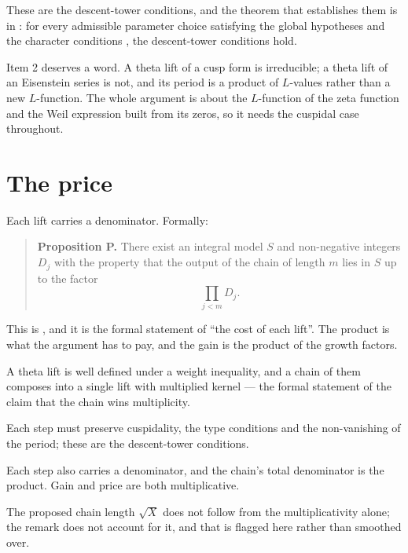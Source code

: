 These are the descent-tower conditions, and the theorem that establishes them
is  in
: for every admissible parameter
choice satisfying the global hypotheses  and the character
conditions , the descent-tower conditions hold.

Item 2 deserves a word. A theta lift of a cusp form is irreducible; a theta
lift of an Eisenstein series is not, and its period is a product of
$L$-values rather than a new $L$-function. The whole argument is about the
$L$-function of the zeta function and the Weil expression built from its
zeros, so it needs the cuspidal case throughout.

\section{The price}Each lift carries a denominator. Formally:

\begin{quote}
\textbf{Proposition P.} There exist an integral model $S$ and non-negative
integers $D_j$ with the property that the output of the chain of length $m$
lies in $S$ up to the factor
\[
\prod_{j < m} D_j.
\]
\end{quote}

This is , and it is the formal statement of ``the cost of each
lift''. The product is what the argument has to pay, and the gain is the
product of the growth factors.

\begin{keytakeaways}
\item A theta lift is well defined under a weight inequality, and a chain of
them composes into a single lift with multiplied kernel --- the formal
statement of the claim that the chain wins multiplicity.
\item Each step must preserve cuspidality, the type conditions and the
non-vanishing of the period; these are the descent-tower conditions.
\item Each step also carries a denominator, and the chain's total denominator
is the product. Gain and price are both multiplicative.
\item The proposed chain length $\sqrt{X}$ does not follow from the
multiplicativity alone; the remark does not account for it, and that is
flagged here rather than smoothed over.
\end{keytakeaways}
